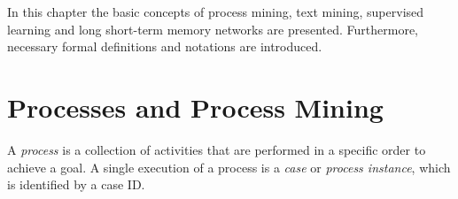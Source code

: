 In this chapter the basic concepts of process mining, text mining, supervised learning and long short-term memory networks are presented. Furthermore, necessary formal definitions and notations are introduced.

\section{Processes and Process Mining}

\begin{definition}[Process]
	A \textit{process} is a collection of activities that are performed in a specific order to achieve a goal.
	A single execution of a process is a \textit{case} or \textit{process instance}, which is identified by a case ID.
\end{definition}

